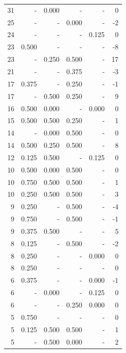 \documentclass[a4paper]{article}\usepackage{graphicx, color}
\begin{document}
\begin{table}[ht]
\begin{tabular}{rrrrrr}
  31 & - & 0.000 & - & - & 0 \\ 
   \rowcolor{sosoColor} 25 & - & - & 0.000 & - & -2 \\ 
   \rowcolor{nullColor} 24 & - & - & - & 0.125 & 0 \\ 
   \rowcolor{nullColor} 23 & 0.500 & - & - & - & -8 \\ 
   \rowcolor{badColor} 23 & - & 0.250 & 0.500 & - & 17 \\ 
   \rowcolor{sosoColor} 21 & - & - & 0.375 & - & -3 \\ 
   \rowcolor{sosoColor} 17 & 0.375 & - & 0.250 & - & -1 \\ 
   \rowcolor{badColor} 17 & - & 0.500 & 0.250 & - & 9 \\ 
  16 & 0.500 & 0.000 & - & 0.000 & 0 \\ 
   \rowcolor{badColor} 15 & 0.500 & 0.500 & 0.250 & - & 1 \\ 
   \rowcolor{badColor} 14 & - & 0.000 & 0.500 & - & 0 \\ 
   \rowcolor{badColor} 14 & 0.500 & 0.250 & 0.500 & - & 8 \\ 
  12 & 0.125 & 0.500 & - & 0.125 & 0 \\ 
   \rowcolor{badColor} 10 & 0.500 & 0.000 & 0.500 & - & 0 \\ 
   \rowcolor{goodColor} 10 & 0.750 & 0.500 & 0.500 & - & 1 \\ 
   \rowcolor{goodColor} 10 & 0.250 & 0.500 & 0.500 & - & 3 \\ 
   \rowcolor{sosoColor} 9 & 0.250 & - & 0.500 & - & -4 \\ 
   \rowcolor{sosoColor} 9 & 0.750 & - & 0.500 & - & -1 \\ 
  9 & 0.375 & 0.500 & - & - & 5 \\ 
   \rowcolor{sosoColor} 8 & 0.125 & - & 0.500 & - & -2 \\ 
   \rowcolor{nullColor} 8 & 0.250 & - & - & 0.000 & 0 \\ 
   \rowcolor{nullColor} 8 & 0.250 & - & - & - & 0 \\ 
   \rowcolor{nullColor} 6 & 0.375 & - & - & 0.000 & -1 \\ 
  6 & - & 0.000 & - & 0.125 & 0 \\ 
   \rowcolor{sosoColor} 6 & - & - & 0.250 & 0.000 & 0 \\ 
   \rowcolor{nullColor} 5 & 0.750 & - & - & - & 0 \\ 
   \rowcolor{goodColor} 5 & 0.125 & 0.500 & 0.500 & - & 1 \\ 
   \rowcolor{badColor} 5 & - & 0.500 & 0.000 & - & 2 \\ 

\end{tabular}
\end{table}
\end{document}
